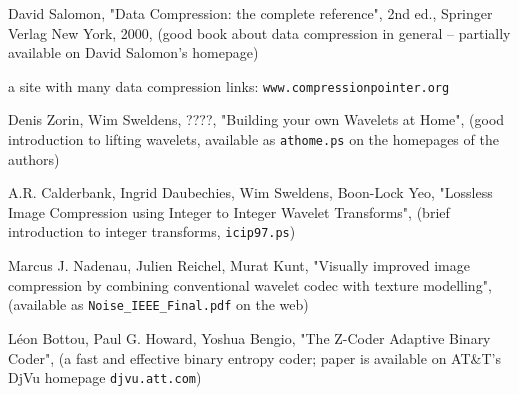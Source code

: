 
\begin{thebibliography}{888}

David Salomon, "Data Compression: the complete reference", 2nd ed., 
Springer Verlag New York, 2000,
(good book about data compression in general -- partially available on David Salomon's homepage)


a site with many data compression links: \verb|www.compressionpointer.org|


Denis Zorin, Wim Sweldens, ????, "Building your own Wavelets at Home", 
(good introduction to lifting wavelets, available as \verb|athome.ps| on the homepages of the authors)


A.R. Calderbank, Ingrid Daubechies, Wim Sweldens, Boon-Lock Yeo,
"Lossless Image Compression using Integer to Integer Wavelet Transforms",
(brief introduction to integer transforms, \verb|icip97.ps|)


Marcus J. Nadenau, Julien Reichel, Murat Kunt,
"Visually improved image compression by combining conventional wavelet codec 
with texture modelling", (available as \verb|Noise_IEEE_Final.pdf| on the web)


L\'eon Bottou, Paul G. Howard, Yoshua Bengio,
"The Z-Coder Adaptive Binary Coder",
(a fast and effective binary entropy coder; paper is available on AT\&T's 
DjVu homepage \verb|djvu.att.com|)

\end{thebibliography}
